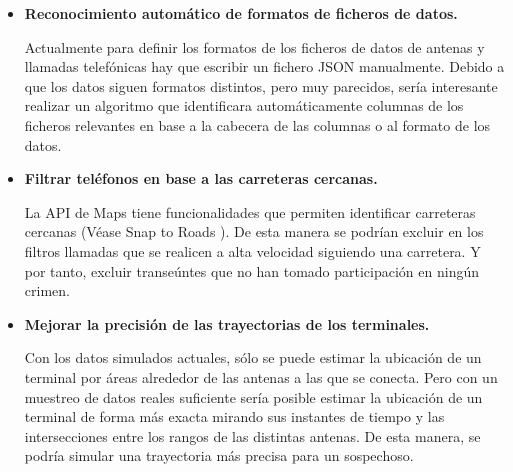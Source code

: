     \begin{itemize}
      \item \textbf{Reconocimiento automático de formatos de ficheros de datos.}
      
      Actualmente para definir los formatos de los ficheros de datos de antenas y llamadas telefónicas hay que escribir un fichero JSON manualmente. 
      Debido a que los datos siguen formatos distintos, pero muy parecidos, sería interesante realizar un algoritmo que identificara automáticamente columnas de los ficheros relevantes en base a la cabecera de las columnas o al formato de los datos.
      
      \item \textbf{Filtrar teléfonos en base a las carreteras cercanas.}
      
      La API de Maps tiene funcionalidades que permiten identificar carreteras cercanas (Véase Snap to Roads \cite{snaproad}). De esta manera se podrían excluir en los filtros llamadas que se realicen a alta velocidad siguiendo una carretera. Y por tanto, excluir transeúntes que no han tomado participación en ningún crimen.
      
      \item \textbf{Mejorar la precisión de las trayectorias de los terminales.}
      
      Con los datos simulados actuales, sólo se puede estimar la ubicación de un terminal por áreas alrededor de las antenas a las que se conecta.
      Pero con un muestreo de datos reales suficiente sería posible estimar la ubicación de un terminal de forma más exacta mirando sus instantes de tiempo y las intersecciones entre los rangos de las distintas antenas. De esta manera, se podría simular una trayectoria más precisa para un sospechoso.
    \end{itemize}